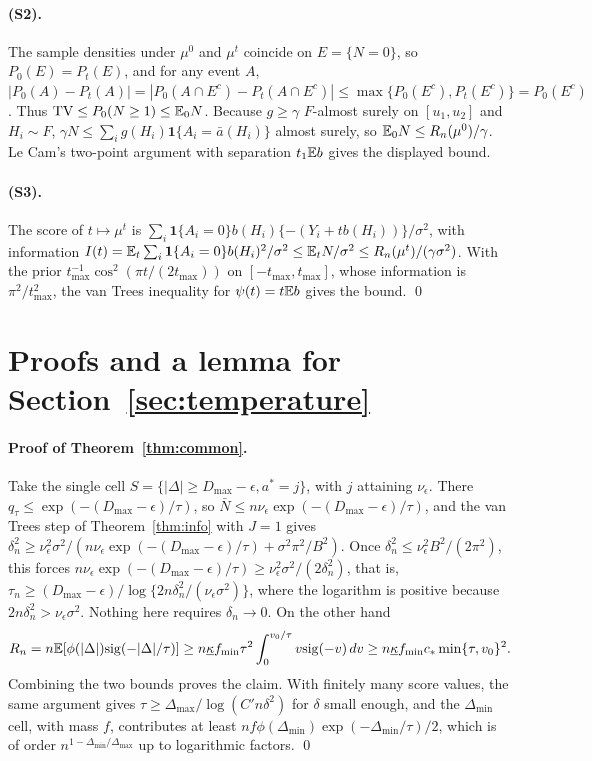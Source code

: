\paragraph{(S2).} The sample densities under $\mu^0$ and $\mu^t$ coincide on
$E=\{N=0\}$, so $P_0(E)=P_t(E)$, and for any event $A$,
$|P_0(A)-P_t(A)|=|P_0(A\cap E^c)-P_t(A\cap E^c)|\le\max\{P_0(E^c),P_t(E^c)\}=P_0(E^c)$.
Thus $\mathrm{TV}\le P_0(N\ge1)\le\mathbb{E}_0N$. Because $g\ge\gamma$ $F$-almost surely on
$[u_1,u_2]$ and $H_i\sim F$, $\gamma N\le\sum_ig(H_i)\mathbf 1\{A_i=\bar a(H_i)\}$
almost surely, so $\mathbb{E}_0N\le R_n(\mu^0)/\gamma$. Le Cam's two-point argument with
separation $t_1\mathbb{E} b$ gives the displayed bound.

\paragraph{(S3).} The score of $t\mapsto\mu^t$ is
$\sum_i\mathbf 1\{A_i=0\}b(H_i)\{-(Y_i+tb(H_i))\}/\sigma^2$, with information
$I(t)=\mathbb{E}_t\sum_i\mathbf 1\{A_i=0\}b(H_i)^2/\sigma^2\le\mathbb{E}_tN/\sigma^2\le R_n(\mu^t)/(\gamma\sigma^2)$.
With the prior $t_{\max}^{-1}\cos^2(\pi t/(2t_{\max}))$ on $[-t_{\max},t_{\max}]$,
whose information is $\pi^2/t_{\max}^2$, the van Trees inequality for
$\psi(t)=t\mathbb{E} b$ gives the bound. \qed

\section{Proofs and a lemma for Section~\ref{sec:temperature}}\label{app:temperature}

\paragraph{Proof of Theorem~\ref{thm:common}.} Take the single cell
$S=\{|\Delta|\ge D_{\max}-\epsilon,a^*=j\}$, with $j$ attaining $\nu_\epsilon$.
There $q_\tau\le \exp(-(D_{\max}-\epsilon)/\tau)$, so
$\bar N\le n\nu_\epsilon\exp(-(D_{\max}-\epsilon)/\tau)$, and the van Trees step
of Theorem~\ref{thm:info} with $J=1$ gives
$\delta_n^2\ge \nu_\epsilon^2\sigma^2/(n\nu_\epsilon\exp(-(D_{\max}-\epsilon)/\tau)+\sigma^2\pi^2/B^2)$.
Once $\delta_n^2\le \nu_\epsilon^2B^2/(2\pi^2)$, this forces
$n\nu_\epsilon\exp(-(D_{\max}-\epsilon)/\tau)\ge \nu_\epsilon^2\sigma^2/(2\delta_n^2)$, that is,
$\tau_n\ge(D_{\max}-\epsilon)/\log\{2n\delta_n^2/(\nu_\epsilon\sigma^2)\}$, where the
logarithm is positive because $2n\delta_n^2>\nu_\epsilon\sigma^2$. Nothing here
requires $\delta_n\to0$. On the other hand
\[
R_n=n\mathbb{E}[\phi(|\Delta|)\mathrm{sig}(-|\Delta|/\tau)]
\ge n\underline\kappa f_{\min}\tau^2\int_0^{v_0/\tau}v\mathrm{sig}(-v)\,dv
\ge n\underline\kappa f_{\min}c_*\min\{\tau,v_0\}^2 .
\]
Combining the two bounds proves the claim. With finitely many score values, the
same argument gives $\tau\ge\Delta_{\max}/\log(C'n\delta^2)$ for $\delta$ small
enough, and the $\Delta_{\min}$ cell, with mass $f$, contributes at least
$nf\phi(\Delta_{\min})\exp(-\Delta_{\min}/\tau)/2$, which is of order
$n^{1-\Delta_{\min}/\Delta_{\max}}$ up to logarithmic factors. \qed

